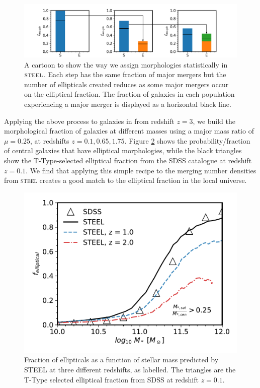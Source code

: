 \begin{figure}[h]
    \centering
    \includegraphics[width = \linewidth]{Figures/Chapter5/Morphology_Evolution.png}
    \caption{A cartoon to show the way we assign morphologies statistically in $\textsc{steel}$. Each step has the same fraction of major mergers but the number of ellipticals created reduces as some major mergers occur on the elliptical fraction. The fraction of galaxies in each population experiencing a major merger is displayed as a horizontal black line.}
    \label{fig:Gal_Morph_toon}
\end{figure}

Applying the above process to galaxies in \steel from redshift $z = 3$, we build the morphological fraction of galaxies at different masses using a major mass ratio of $\mu = 0.25$, at redshifts $z = 0.1, 0.65, 1.75$. Figure \ref{fig:Gal_Morph} shows the probability/fraction of central galaxies that have elliptical morphologies, while the black triangles show the T-Type-selected elliptical fraction from the SDSS catalogue at redshift $z = 0.1$. We find that applying this simple recipe to the merging number densities from \textsc{steel} creates a good match to the elliptical fraction in the local universe.

\begin{figure}[h]
    \centering
    \includegraphics[width = \linewidth]{Figures/Chapter5/GalaxyMorphologies.pdf}
    \caption{Fraction of ellipticals as a function of stellar mass predicted by STEEL at three different redshifts, as labelled. The triangles are the T-Type selected elliptical fraction from SDSS at redshift $z = 0.1$.}
    \label{fig:Gal_Morph}
\end{figure}


